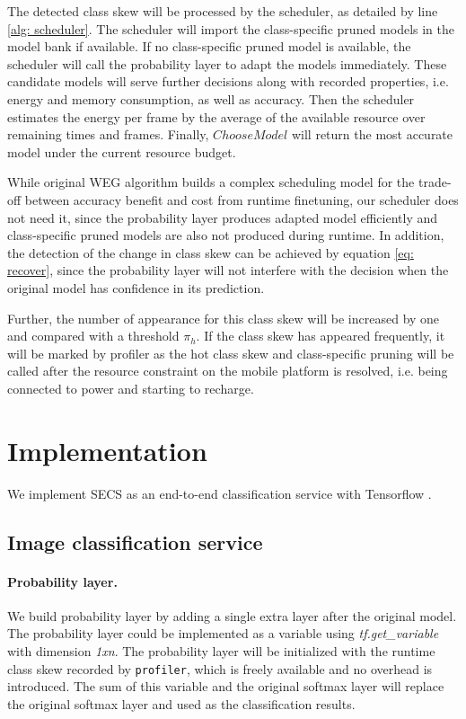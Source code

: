 \documentclass[pageno]{jpaper}
\begin{document}
The detected class skew will be processed by the scheduler, as detailed by line \ref{alg: scheduler}. The scheduler will import the class-specific pruned models in the model bank if available. If no class-specific pruned model is available, the scheduler will call the probability layer to adapt the models immediately. These candidate models will serve further decisions along with recorded properties, i.e. energy and memory consumption, as well as accuracy. Then the scheduler estimates the energy per frame by the average of the available resource over remaining times and frames. Finally, $ChooseModel$ will return the most accurate model under the current resource budget. 

While original WEG algorithm \cite{shen2016fast} builds a complex scheduling model for the trade-off between accuracy benefit and cost from runtime finetuning, our scheduler does not need it, since the probability layer produces adapted model efficiently and class-specific pruned models are also not produced during runtime. In addition, the detection of the change in class skew can be achieved by equation \ref{eq: recover}, since the probability layer will not interfere with the decision when the original model has confidence in its prediction.




Further, the number of appearance for this class skew will be increased by one and compared with a threshold $\pi_h$. If the class skew has appeared frequently, it will be marked by profiler as the hot class skew and class-specific pruning will be called after the resource constraint on the mobile platform is resolved, i.e. being connected to power and starting to recharge.





\section{Implementation} \label{implementation}
We implement SECS as an end-to-end classification service with Tensorflow \cite{tensorflow2015-whitepaper}. 


\subsection{Image classification service}
\paragraph{Probability layer.}
We build probability layer by adding a single extra layer after the original model. The probability layer could be implemented as a variable using \textit{tf.get\_variable} with dimension \textit{1xn}. The probability layer will be initialized with the runtime class skew recorded by \texttt{profiler}, which is freely available and no overhead is introduced. The sum of this variable and the original softmax layer will replace the original softmax layer and used as the classification results. 
\end{document}
